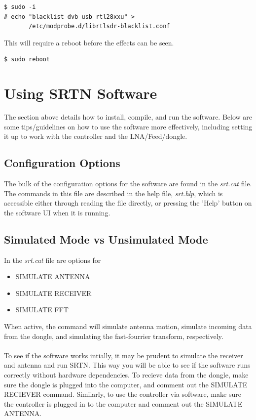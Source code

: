 \documentclass[11pt]{article} %
\begin{document}
\begin{lstlisting}[frame=single]
$ sudo -i
# echo "blacklist dvb_usb_rtl28xxu" > 
       /etc/modprobe.d/librtlsdr-blacklist.conf
\end{lstlisting}
This will require a reboot before the effects can be seen.
\begin{lstlisting}[frame=single]
$ sudo reboot
\end{lstlisting}


\newpage 
\section{Using SRTN Software}

The section above details how to install, compile, and run the software. Below are some tips/guidelines on how to use the software more effectively, including setting it up to work with the controller and the LNA/Feed/dongle.

\subsection{Configuration Options}

The bulk of the configuration options for the software are found in the \emph{srt.cat} file. The commands in this file are described in the help file, \emph{srt.hlp}, which is accessible either through reading the file directly, or pressing the 'Help' button on the software UI when it is running. 


\subsection{Simulated Mode vs Unsimulated Mode}

In the \emph{srt.cat} file are options for 

\begin{itemize}
\item SIMULATE ANTENNA
\item SIMULATE RECEIVER
\item SIMULATE FFT
\end{itemize}

When active, the command will simulate antenna motion, simulate incoming data from the dongle, and simulating the fast-fourrier transform, respectively. 
\\ \\
To see if the software works intially, it may be prudent to simulate the receiver and antenna and run SRTN. This way you will be able to see if the software runs correctly without hardware dependencies. To recieve data from the dongle, make sure the dongle is plugged into the computer, and comment out the SIMULATE RECIEVER command. Similarly, to use the controller via software, make sure the controller is plugged in to the computer and comment out the SIMULATE ANTENNA.
\end{document}
